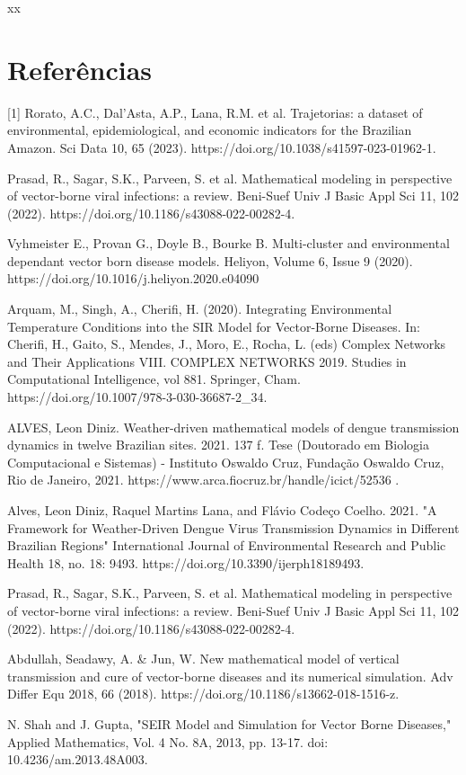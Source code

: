 \documentclass[12pt]{article}
\begin{document}
xx

\newpage
\section{Referências}

[1] Rorato, A.C., Dal’Asta, A.P., Lana, R.M. et al. Trajetorias: a dataset of environmental, epidemiological, and economic indicators for the Brazilian Amazon. Sci Data 10, 65 (2023). https://doi.org/10.1038/s41597-023-01962-1.

\noindent [2] Prasad, R., Sagar, S.K., Parveen, S. et al. Mathematical modeling in perspective of vector-borne viral infections: a review. Beni-Suef Univ J Basic Appl Sci 11, 102 (2022). https://doi.org/10.1186/s43088-022-00282-4.

\noindent [3] Vyhmeister E., Provan G., Doyle B., Bourke B. Multi-cluster and environmental dependant vector born disease models. Heliyon, Volume 6, Issue 9 (2020). https://doi.org/10.1016/j.heliyon.2020.e04090

\noindent [4] Arquam, M., Singh, A., Cherifi, H. (2020). Integrating Environmental Temperature Conditions into the SIR Model for Vector-Borne Diseases. In: Cherifi, H., Gaito, S., Mendes, J., Moro, E., Rocha, L. (eds) Complex Networks and Their Applications VIII. COMPLEX NETWORKS 2019. Studies in Computational Intelligence, vol 881. Springer, Cham. https://doi.org/10.1007/978-3-030-36687-2\_34.

\noindent [5] ALVES, Leon Diniz. Weather-driven mathematical models of dengue transmission dynamics in twelve Brazilian sites. 2021. 137 f. Tese (Doutorado em Biologia Computacional e Sistemas) - Instituto Oswaldo Cruz, Fundação Oswaldo Cruz, Rio de Janeiro, 2021. https://www.arca.fiocruz.br/handle/icict/52536	.

\noindent [6] Alves, Leon Diniz, Raquel Martins Lana, and Flávio Codeço Coelho. 2021. "A Framework for Weather-Driven Dengue Virus Transmission Dynamics in Different Brazilian Regions" International Journal of Environmental Research and Public Health 18, no. 18: 9493. https://doi.org/10.3390/ijerph18189493.

\noindent [7] Prasad, R., Sagar, S.K., Parveen, S. et al. Mathematical modeling in perspective of vector-borne viral infections: a review. Beni-Suef Univ J Basic Appl Sci 11, 102 (2022). https://doi.org/10.1186/s43088-022-00282-4.

\noindent [8] Abdullah, Seadawy, A. & Jun, W. New mathematical model of vertical transmission and cure of vector-borne diseases and its numerical simulation. Adv Differ Equ 2018, 66 (2018). https://doi.org/10.1186/s13662-018-1516-z.

\noindent [9] N. Shah and J. Gupta, "SEIR Model and Simulation for Vector Borne Diseases," Applied Mathematics, Vol. 4 No. 8A, 2013, pp. 13-17. doi: 10.4236/am.2013.48A003.
\end{document}
